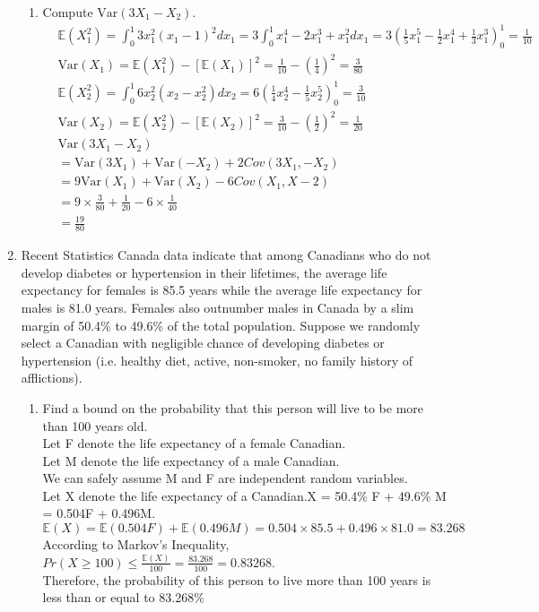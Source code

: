 \documentclass[11pt]{article}
\newcommand{\e}{\mathbb{E}}
\newcommand{\var}{\text{Var}}
\begin{document}
\begin{enumerate}[label=\textbf{Question \arabic*:},start=1]
\begin{enumerate}
	\item Compute $\var(3X_1 - X_2)$.\\
	\begin{align*}
	& \e(X_1^2) = \int_0^1 3 x_1^2 (x_1 - 1)^2 d x_1 = 3 \int_0^1 x_1^4 - 2x_1^3 + x_1^2 dx_1 =  3 (\frac{1}{5}x_1^5 - \frac{1}{2}x_1^4 + \frac{1}{3} x_1^3)_0^1 =  \frac{1}{10} \\
	& \var(X_1) = \e(X_1^2) - [\e(X_1)]^2  = \frac{1}{10} - (\frac{1}{4})^2 = \frac{3}{80} \\
	& \e(X_2^2) = \int_0^1 6 x_2^2 (x_2 - x_2^2) dx_2 = 6 (\frac{1}{4} x_2^4 - \frac{1}{5} x_2^5)_0^1 = \frac{3}{10} \\
	& \var(X_2) = \e(X_2^2) - [\e(X_2)]^2 =  \frac{3}{10} - (\frac{1}{2})^2 = \frac{1}{20} \\
	& \var(3X_1 - X_2) \\
	& = \var(3X_1) + \var(-X_2) + 2 Cov(3X_1, -X_2) \\
	& = 9 \var(X_1) + \var(X_2) - 6Cov(X_1, X-2) \\
	& = 9 \times \frac{3}{80} + \frac{1}{20} - 6 \times \frac{1}{40} \\
	& = \frac{19}{80}
	\end{align*}

\end{enumerate}



\item 
Recent Statistics Canada data indicate that among Canadians who do not develop diabetes or hypertension in their lifetimes, the average life expectancy for females is 85.5 years while the average life expectancy for males is 81.0 years. Females also outnumber males in Canada by a slim margin of 50.4\% to 49.6\% of the total population. Suppose we randomly select a Canadian with negligible chance of developing diabetes or hypertension (i.e. healthy diet, active, non-smoker, no family history of afflictions).

\begin{enumerate}
  \item Find a bound on the probability that this person will live to be more than 100 years old.\\
  
  Let F denote the life expectancy of a female Canadian.\\
  Let M denote the life expectancy of a male Canadian. \\
  We can safely assume M and F are independent random variables. \\
  Let X denote the life expectancy of a Canadian.X = 50.4\% F + 49.6\% M = 0.504F + 0.496M. \\
  $\e(X) = \e(0.504F) + \e(0.496M) = 0.504 \times 85.5 + 0.496 \times 81.0 = 83.268 $\\
  According to Markov's Inequality, $Pr(X \geq 100) \leq \frac{\e(X)}{100} = \frac{83.268}{100} = 0.83268$.\\
  Therefore, the probability of this person to live more than 100 years is less than or equal to 83.268\% \\


\end{enumerate}
\end{enumerate}
\end{document}
